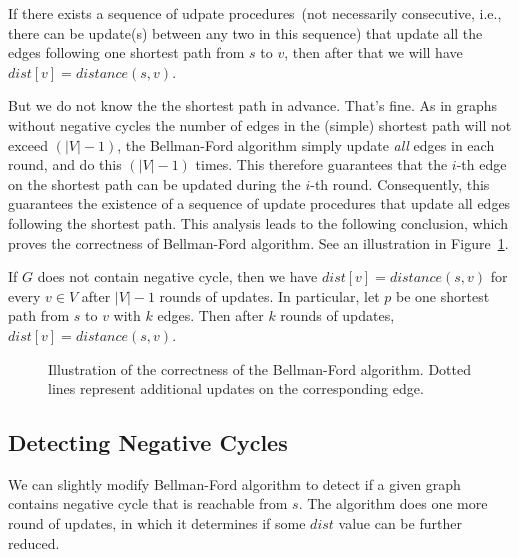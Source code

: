 \begin{fact}
\label{fact4}
If there exists a sequence of udpate procedures~(not necessarily consecutive,
i.e., there can be update(s) between any two in this sequence) that update all the edges following one shortest path
from $s$ to $v$, then after that we will have $dist[v] = distance(s, v)$.
\end{fact}

But we do not know the the shortest path in advance. That's fine.
As in graphs without negative cycles the number of edges in the (simple) shortest path will not exceed $(|V| - 1)$, the Bellman-Ford algorithm
simply update \emph{all} edges in each round, and do this $(|V| - 1)$ times.
This therefore guarantees that the $i$-th edge on the shortest path can be updated during the $i$-th round.
Consequently, this guarantees the existence of a sequence of update procedures that update all edges following the shortest path.
This analysis leads to the following conclusion, which proves the correctness of Bellman-Ford algorithm.
See an illustration in Figure~\ref{fig:bellman}.
\begin{fact}
\label{fact5}
If $G$ does not contain negative cycle,  then we have $dist[v] = distance(s,v)$ for every $v\in V$ after $|V| -1$ rounds of updates.
In particular, let $p$ be one shortest path from $s$ to $v$ with $k$ edges.  
Then after $k$ rounds of updates, $dist[v] = distance(s,v)$.
\end{fact}

\begin{figure}[h]
\centering{}
\caption{Illustration of the correctness of the Bellman-Ford algorithm.
Dotted lines represent additional updates on the corresponding edge.}
\label{fig:bellman}
\end{figure}



\subsection*{Detecting Negative Cycles}

We can slightly modify Bellman-Ford algorithm to detect if a given graph contains negative cycle that is reachable from $s$.
The algorithm does one more round of updates, in which it determines if some $dist$ value can be further reduced.

\begin{algorithmblock}[0.8\textwidth]
	\xxx
	\xxx
	\xxx
	\xxx
	\xxx
	\xxx
	\xxx
	\xxx
	\xxx
\end{algorithmblock}


